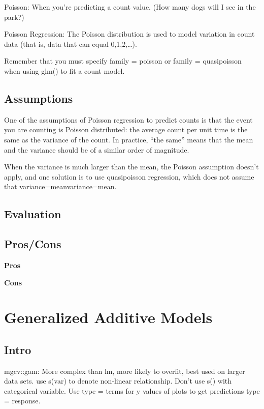 \documentclass[]{book}
\theoremstyle{definition}
\theoremstyle{definition}
\theoremstyle{definition}
\theoremstyle{remark}
\begin{document}
Poisson: When you're predicting a count value. (How many dogs will I see
in the park?)

Poisson Regression: The Poisson distribution is used to model variation
in count data (that is, data that can equal 0,1,2,\ldots{}).

Remember that you must specify family = poisson or family = quasipoisson
when using glm() to fit a count model.

\subsection{Assumptions}\label{assumptions-9}

One of the assumptions of Poisson regression to predict counts is that
the event you are counting is Poisson distributed: the average count per
unit time is the same as the variance of the count. In practice, ``the
same'' means that the mean and the variance should be of a similar order
of magnitude.

When the variance is much larger than the mean, the Poisson assumption
doesn't apply, and one solution is to use quasipoisson regression, which
does not assume that variance=meanvariance=mean.

\subsection{Evaluation}\label{evaluation-9}

\subsection{Pros/Cons}\label{proscons-9}

\textbf{Pros}

\textbf{Cons}

\section{Generalized Additive Models}\label{generalized-additive-models}

\subsection{Intro}\label{intro-10}

mgcv::gam: More complex than lm, more likely to overfit, best used on
larger data sets. use s(var) to denote non-linear relationship. Don't
use s() with categorical variable. Use type = terms for y values of
plots to get predictions type = response.
\end{document}
